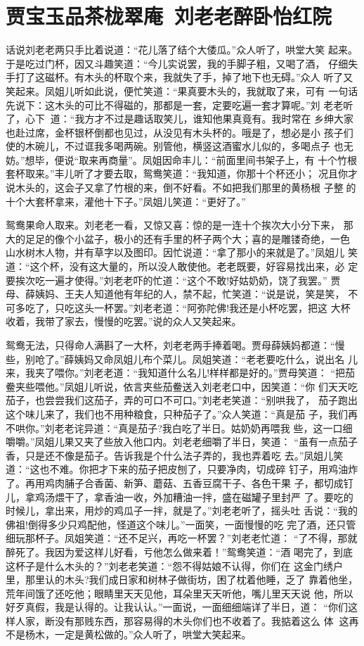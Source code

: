 \chapter{贾宝玉品茶栊翠庵~刘老老醉卧怡红院}

话说刘老老两只手比着说道：“花儿落了结个大倭瓜。”众人听了，哄堂大笑
起来。于是吃过门杯，因又斗趣笑道：“今儿实说罢，我的手脚子粗，又喝了酒，
仔细失手打了这磁杯。有木头的杯取个来，我就失了手，掉了地下也无碍。”众人
听了又笑起来。凤姐儿听如此说，便忙笑道：“果真要木头的，我就取了来，可有
一句话先说下：这木头的可比不得磁的，那都是一套，定要吃遍一套才算呢。”刘
老老听了，心下道：“我方才不过是趣话取笑儿，谁知他果真竟有。我时常在
乡绅大家也赴过席，金杯银杯倒都也见过，从没见有木头杯的。哦是了，想必是小
孩子们使的木碗儿，不过诓我多喝两碗。别管他，横竖这酒蜜水儿似的，多喝点子
也无妨。”想毕，便说“取来再商量”。凤姐因命丰儿：“前面里间书架子上，有
十个竹根套杯取来。”丰儿听了才要去取，鸳鸯笑道：“我知道，你那十个杯还小；
况且你才说木头的，这会子又拿了竹根的来，倒不好看。不如把我们那里的黄杨根
子整的十个大套杯拿来，灌他十下子。”凤姐儿笑道：“更好了。”

鸳鸯果命人取来。刘老老一看，又惊又喜：惊的是一连十个挨次大小分下来，
那大的足足的像个小盆子，极小的还有手里的杯子两个大；喜的是雕镂奇绝，一色
山水树木人物，并有草字以及图印。因忙说道：“拿了那小的来就是了。”凤姐儿
笑道：“这个杯，没有这大量的，所以没人敢使他。老老既要，好容易找出来，必
定要挨次吃一遍才使得。”刘老老吓的忙道：“这个不敢!好姑奶奶，饶了我罢。”
贾母、薛姨妈、王夫人知道他有年纪的人，禁不起，忙笑道：“说是说，笑是笑，
不可多吃了，只吃这头一杯罢。”刘老老道：“阿弥陀佛!我还是小杯吃罢，把这
大杯收着，我带了家去，慢慢的吃罢。”说的众人又笑起来。

鸳鸯无法，只得命人满斟了一大杯，刘老老两手捧着喝。贾母薛姨妈都道：“慢
些，别呛了。”薛姨妈又命凤姐儿布个菜儿。凤姐笑道：“老老要吃什么，说出名
儿来，我夹了喂你。”刘老老道：“我知道什么名儿!样样都是好的。”贾母笑道：
“把茄鲞夹些喂他。”凤姐儿听说，依言夹些茄鲞送入刘老老口中，因笑道：“你
们天天吃茄子，也尝尝我们这茄子，弄的可口不可口。”刘老老笑道：“别哄我了，
茄子跑出这个味儿来了，我们也不用种粮食，只种茄子了。”众人笑道：“真是茄
子，我们再不哄你。”刘老老诧异道：“真是茄子?我白吃了半日。姑奶奶再喂我
些，这一口细嚼嚼。”凤姐儿果又夹了些放入他口内。刘老老细嚼了半日，笑道：
“虽有一点茄子香，只是还不像是茄子。告诉我是个什么法子弄的，我也弄着吃
去。”凤姐儿笑道：“这也不难。你把才下来的茄子把皮刨了，只要净肉，切成碎
钉子，用鸡油炸了。再用鸡肉脯子合香菌、新笋、蘑菇、五香豆腐干子、各色干果
子，都切成钉儿，拿鸡汤煨干了，拿香油一收，外加糟油一拌，盛在磁罐子里封严
了。要吃的时候儿，拿出来，用炒的鸡瓜子一拌，就是了。”刘老老听了，摇头吐
舌说：“我的佛祖!倒得多少只鸡配他，怪道这个味儿。”一面笑，一面慢慢的吃
完了酒，还只管细玩那杯子。凤姐笑道：“还不足兴，再吃一杯罢？”刘老老忙道：
“了不得，那就醉死了。我因为爱这样儿好看，亏他怎么做来着！”鸳鸯笑道：“酒
喝完了，到底这杯子是什么木头的？”刘老老笑道：“怨不得姑娘不认得，你们在
这金门绣户里，那里认的木头?我们成日家和树林子做街坊，困了枕着他睡，乏了
靠着他坐，荒年间饿了还吃他；眼睛里天天见他，耳朵里天天听他，嘴儿里天天说
他，所以好歹真假，我是认得的。让我认认。”一面说，一面细细端详了半日，道：
“你们这样人家，断没有那贱东西，那容易得的木头你们也不收着了。我掂着这么
体，这再不是杨木，一定是黄松做的。”众人听了，哄堂大笑起来。

